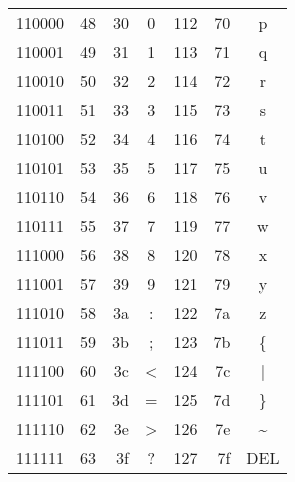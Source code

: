 \begin{tabular}{CRRC|RRC}
    110000 & 48  & 30  & 0     & 112 & 70  & p                \\
    110001 & 49  & 31  & 1     & 113 & 71  & q                \\
    110010 & 50  & 32  & 2     & 114 & 72  & r                \\
    110011 & 51  & 33  & 3     & 115 & 73  & s                \\
    110100 & 52  & 34  & 4     & 116 & 74  & t                \\
    110101 & 53  & 35  & 5     & 117 & 75  & u                \\
    110110 & 54  & 36  & 6     & 118 & 76  & v                \\
    110111 & 55  & 37  & 7     & 119 & 77  & w                \\
    111000 & 56  & 38  & 8     & 120 & 78  & x                \\
    111001 & 57  & 39  & 9     & 121 & 79  & y                \\
    111010 & 58  & 3a  & :     & 122 & 7a  & z                \\
    111011 & 59  & 3b  & ;     & 123 & 7b  & \{               \\
    111100 & 60  & 3c  & <     & 124 & 7c  & |                \\
    111101 & 61  & 3d  & =     & 125 & 7d  & \}               \\
    111110 & 62  & 3e  & >     & 126 & 7e  & \textasciitilde  \\
    111111 & 63  & 3f  & ?     & 127 & 7f  & DEL              \\
    \bottomrule
\end{tabular}
